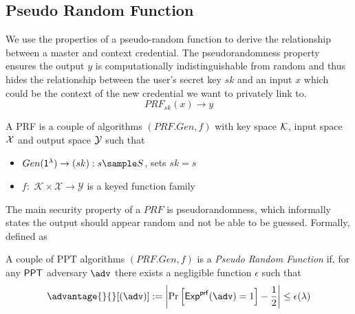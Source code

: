 
\subsection{Pseudo Random Function}
We use the properties of a pseudo-random function to derive the relationship between a master and context credential. The pseudorandomness property ensures the output $y$ is computationally indistinguishable from random and thus hides the relationship between the user's secret key $sk$ and an input $x$ which could be the context of the new credential we want to privately link to.
\[
    PRF_{sk}(x) \to y
\]

\begin{definition}
    A PRF is a couple of algorithms $(PRF.Gen, f)$ with key space $\mathcal{K}$, input space $\mathcal{X}$ and output space $\mathcal{Y}$ such that 
    \begin{itemize}
        \item $Gen(\secparam) \to (sk): s \sample S$, sets $sk = s$
        \item $f:$ $\mathcal{K} \times \mathcal{X} \to \mathcal{Y}$ is a keyed function family
    \end{itemize}
\end{definition}

The main security property of a $PRF$ is pseudorandomness, which informally states the output should appear random and not be able to be guessed. Formally, defined as

\begin{definition}[Pseudorandomness]
    A couple of PPT algorithms $(PRF.Gen, f)$ is a \textit{Pseudo Random Function} if, for any $\mathsf{PPT}$ adversary $\adv$ there exists a negligible function $\epsilon$ such that 
    \[
    \advantage{}{}[(\adv)] := 
        \left|
    \Pr     \left[ 
                \mathsf{Exp}^{\mathsf{prf}}(\adv) = 1
            \right] - \frac{1}{2}
        \right| \leq \epsilon(\lambda)
    \]
\end{definition}

